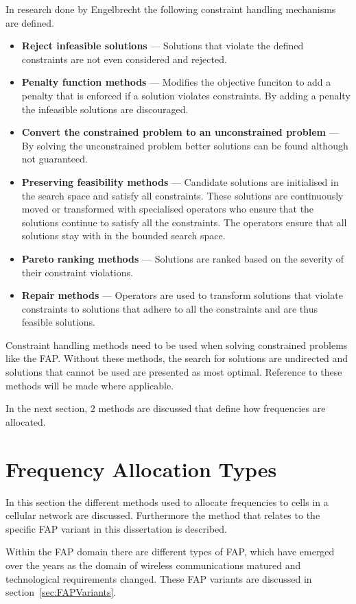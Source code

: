 In research done by Engelbrecht\cite{CompuIntelligenceIntro} the following constraint handling mechanisms are defined.
\begin{itemize}
\item{\textbf{Reject infeasible solutions}} --- Solutions that violate the defined constraints are not even considered and rejected.
\item{\textbf{Penalty function methods}} --- Modifies the objective funciton to add a penalty that is enforced if a solution violates constraints. By adding a penalty the infeasible solutions are discouraged.
\item{\textbf{Convert the constrained problem to an unconstrained problem}} --- By solving the unconstrained problem better solutions can be found although not guaranteed.
\item{\textbf{Preserving feasibility methods}} --- Candidate solutions are initialised in the search space and satisfy all constraints. These solutions are continuously moved or transformed with specialised operators who ensure that the solutions continue to satisfy all the constraints. The operators ensure that all solutions stay with in the bounded search space.
\item{\textbf{Pareto ranking methods}} --- Solutions are ranked based on the severity of their constraint violations.
\item{\textbf{Repair methods}} --- Operators are used to transform solutions that violate constraints to solutions that adhere to all the constraints and are thus feasible solutions.
\end{itemize}

Constraint handling methods need to be used when solving constrained problems like the \gls{FAP}. Without these methods, the search for solutions are undirected and solutions that cannot be used are presented as most optimal. Reference to these methods will be made where applicable.

In the next section, 2 methods are discussed that define how frequencies are allocated.
\section{Frequency Allocation Types}
\label{sec:FreqAssignmentTypes}
In this section the different methods used to allocate frequencies to cells in a cellular network are discussed. Furthermore the method that relates to the specific \gls{FAP} variant in this dissertation is described.

Within the \gls{FAP} domain there are different types of \gls{FAP}, which have emerged over the years as the domain of wireless communications matured and technological requirements changed. These \gls{FAP} variants are discussed in section~\ref{sec:FAPVariants}.

